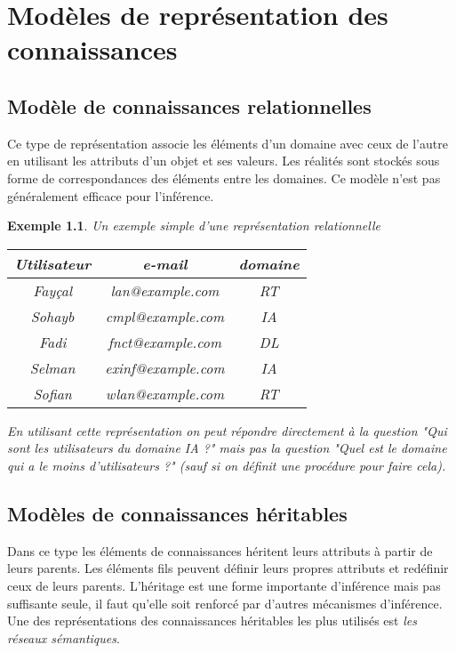 \documentclass[12pt,a4paper]{report}
\newtheorem{example}{Exemple}
\begin{document}
\chapter{Modèles de représentation des connaissances}
\section{Modèle de connaissances relationnelles}
Ce type de représentation associe les éléments d'un domaine avec ceux de l'autre en utilisant les attributs d'un objet et
ses valeurs. Les réalités sont stockés sous forme de correspondances des éléments entre les domaines. Ce modèle n'est pas
généralement efficace pour l'inférence.\cite{KRC}
\begin{example}
Un exemple simple d'une représentation relationnelle

\begin{table}[h]
\centering
\begin{tabular}{|c|c|c|}
\hline
Utilisateur & e-mail & domaine \\
\hline
Fayçal & lan@example.com & RT \\
\hline
Sohayb & cmpl@example.com & IA \\
\hline
Fadi & fnct@example.com & DL \\
\hline
Selman & exinf@example.com & IA \\
\hline
Sofian & wlan@example.com & RT \\
\hline
\end{tabular}
\end{table}
En utilisant cette représentation on peut répondre directement à la question "Qui sont les utilisateurs du domaine IA ?"
mais pas la question "Quel est le domaine qui a le moins d'utilisateurs ?" (sauf si on définit une procédure
pour faire cela).
\end{example}

\section{Modèles de connaissances héritables}
Dans ce type les éléments de connaissances héritent leurs attributs à partir de leurs parents. Les éléments fils
peuvent définir leurs propres attributs et redéfinir ceux de leurs parents. L'héritage est une forme importante
d'inférence mais pas suffisante seule, il faut qu'elle soit renforcé par d'autres mécanismes d'inférence.
Une des représentations des connaissances héritables les plus utilisés est \emph{les réseaux sémantiques}.\cite{KRC}
\end{document}
